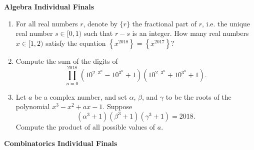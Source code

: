 \documentclass[10pt]{article}
\begin{document}
\begin{center}
\huge\textbf{Algebra Individual Finals}
\end{center} \vspace{3pt}

\begin{enumerate}

\item For all real numbers $r$, denote by $\{r\}$ the fractional part of $r$, i.e. the unique real number $s\in[0,1)$ such that $r-s$ is an integer.  How many real numbers $x\in[1,2)$ satisfy the equation $\left\{x^{2018}\right\} = \left\{x^{2017}\right\}?$

\item Compute the sum of the digits of \[\prod_{n=0}^{2018}\left(10^{2\cdot 3^n} - 10^{3^n} + 1\right)\left(10^{2\cdot 3^n} + 10^{3^n} + 1\right).\]

\item Let $a$ be a complex number, and set $\alpha$, $\beta$, and $\gamma$ to be the roots of the polynomial $x^3 - x^2 + ax - 1$.  Suppose \[(\alpha^3+1)(\beta^3+1)(\gamma^3+1) = 2018.\] Compute the product of all possible values of $a$.
\end{enumerate}

\newpage

\begin{center}
\huge\textbf{Combinatorics Individual Finals}
\end{center} \vspace{3pt}
\end{document}
